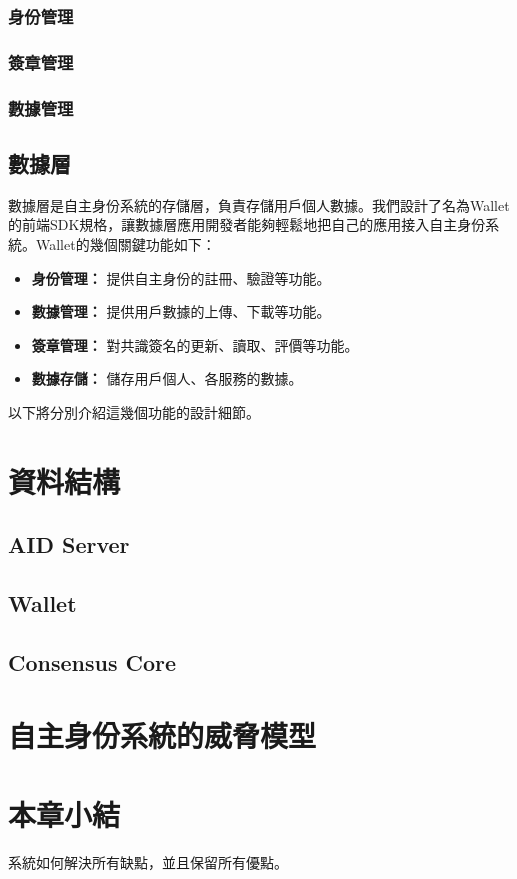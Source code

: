 \subsubsection{身份管理}
\subsubsection{簽章管理}
\subsubsection{數據管理}
\subsection{數據層}
數據層是自主身份系統的存儲層，負責存儲用戶個人數據。我們設計了名為Wallet的前端SDK規格，讓數據層應用開發者能夠輕鬆地把自己的應用接入自主身份系統。Wallet的幾個關鍵功能如下：
\begin{itemize}
  \item \textbf{身份管理：} 提供自主身份的註冊、驗證等功能。
  \item \textbf{數據管理：} 提供用戶數據的上傳、下載等功能。
  \item \textbf{簽章管理：} 對共識簽名的更新、讀取、評價等功能。
  \item \textbf{數據存儲：} 儲存用戶個人、各服務的數據。
\end{itemize}
以下將分別介紹這幾個功能的設計細節。
\section{資料結構}
\subsection{AID Server}
\subsection{Wallet}
\subsection{Consensus Core}
\section{自主身份系統的威脅模型}
\section{本章小結}
系統如何解決所有缺點，並且保留所有優點。